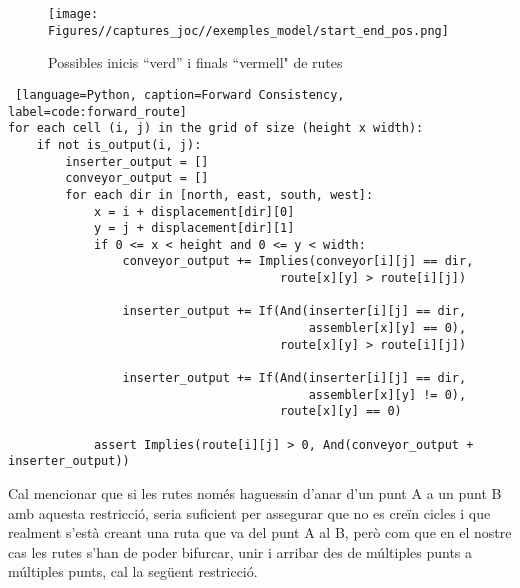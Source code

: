 \begin{figure}
    \centering
    \texttt{[image: Figures//captures\_joc//exemples\_model/start\_end\_pos.png]}
    \caption{Possibles inicis ``verd'' i finals ``vermell" de rutes}
    \label{fig:start_end_route}
\end{figure}

\begin{lstlisting} [language=Python, caption=Forward Consistency, label=code:forward_route] 
for each cell (i, j) in the grid of size (height x width):
    if not is_output(i, j):
        inserter_output = []
        conveyor_output = []
        for each dir in [north, east, south, west]:
            x = i + displacement[dir][0]
            y = j + displacement[dir][1]
            if 0 <= x < height and 0 <= y < width:
                conveyor_output += Implies(conveyor[i][j] == dir,
                                      route[x][y] > route[i][j])
                                      
                inserter_output += If(And(inserter[i][j] == dir,
                                          assembler[x][y] == 0),
                                      route[x][y] > route[i][j])

                inserter_output += If(And(inserter[i][j] == dir,
                                          assembler[x][y] != 0),
                                      route[x][y] == 0)

            assert Implies(route[i][j] > 0, And(conveyor_output + inserter_output))
\end{lstlisting}

Cal mencionar que si les rutes només haguessin d'anar d'un punt A a un punt B amb aquesta restricció, seria suficient per assegurar que no es creïn cicles i que realment s'està creant una ruta que va del punt A al B, però com que en el nostre cas les rutes s'han de poder bifurcar, unir i arribar des de múltiples punts a múltiples punts, cal la següent restricció.

